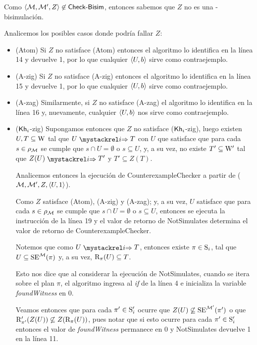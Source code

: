 \begin{demostracion}
\begin{itemize}
        Como $\tup{\modults,\modults',Z} \not \in \CBisim$, entonces sabemos que $Z$ no es una \KHilogic-bisimulación.

        Analicemos los posibles casos donde podría fallar $Z$:

        \begin{itemize}
            \item (Atom) Si $Z$ no satisface (Atom) entonces el algoritmo lo identifica en la línea 14 y devuelve 1, por lo que
            cualquier $\tup{U,b}$ sirve como contraejemplo.
            \item (A-zig) Si $Z$ no satisface (A-zig) entonces el algoritmo lo identifica en la línea 15 y devuelve 1, 
            por lo que cualquier $\tup{U,b}$ sirve como contraejemplo.
            \item (A-zag) Similarmente, si $Z$ no satisface (A-zag) el algoritmo lo identifica en la línea 16 y,  
            nuevamente, cualquier $\tup{U,b}$ nos sirve como contraejemplo.
            \item ($\khi$-zig) Supongamos entonces que $Z$ no satisface ($\khi$-zig), luego existen $U, T \subseteq \W$ tal que
            $U \ultsExecAgi T$ con $U$ que satisface que para cada $s \in \rho_\model$ se cumple que $s \cap U = \emptyset$ o $s \subseteq U$, 
            y, a su vez, no existe $T' \subseteq \W'$ tal que $Z(U) \ultsExecAgi T'$ y $T' \subseteq Z(T)$.

            Analicemos entonces la ejecución de \textsf{CounterexampleChecker} a partir de ($\modults,\modults',Z,\tup{U,1}$).

            Como $Z$ satisface (Atom), (A-zig) y (A-zag); y, a su vez, $U$ satisface que para cada $s \in \rho_\model$ se cumple 
            que $s \cap U = \emptyset$ o $s \subseteq U$, entonces se ejecuta la instrucción de la línea 19 y el valor de retorno de 
            \textsf{NotSimulates} determina el valor de retorno de \textsf{CounterexampleChecker}.

            Notemos que como $U \ultsExecAgi T$, entonces existe $\pi \in \S_i$, tal que $U \subseteq \sexec^{\model}(\pi)$ y, 
            a su vez, $\R_\pi(U) \subseteq T$. 
            
            Esto nos dice que al considerar la ejecución de \textsf{NotSimulates}, cuando se itera sobre el plan $\pi$, el algoritmo 
            ingresa al \textit{if} de la línea 4 e inicializa la variable \textit{foundWitness} en 0.

            Veamos entonces que para cada $\pi' \in \S_i'$ ocurre que $Z(U) \not \subseteq \sexec^{\model'}(\pi')$ o que 
            $\R'_{\pi'}(Z(U)) \not \subseteq Z(\R_\pi(U))$, pues notar que si esto ocurre para cada $\pi'\in\S'_i$ entonces 
            el valor de \textit{foundWitness} permanece en 0 y \textsf{NotSimulates} devuelve 1 en la línea 11.


\end{itemize}
\end{itemize}
\end{demostracion}
